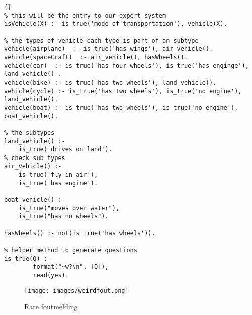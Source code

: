 \begin{lstlisting}{}
% this will be the entry to our expert system
isVehicle(X) :- is_true('mode of transportation'), vehicle(X).

% the types of vehicle each type is part of an subtype
vehicle(airplane)  :- is_true('has wings'), air_vehicle().
vehicle(spaceCraft)  :- air_vehicle(), hasWheels().
vehicle(car)  :- is_true('has four wheels'), is_true('has enginge'), land_vehicle() .
vehicle(bike) :- is_true('has two wheels'), land_vehicle().
vehicle(cycle) :- is_true('has two wheels'), is_true('no engine'), land_vehicle().
vehicle(boat) :- is_true('has two wheels'), is_true('no engine'), boat_vehicle().

% the subtypes
land_vehicle() :-
	is_true('drives on land').
% check sub types
air_vehicle() :-
	is_true('fly in air'),
	is_true('has engine').

boat_vehicle() :-
	is_true("moves over water"),
    is_true("has no wheels").

hasWheels() :- not(is_true('has wheels')).

% helper method to generate questions
is_true(Q) :-
        format("~w?\n", [Q]),
        read(yes).
\end{lstlisting}

\begin{figure}[!h]
    \centering
    \texttt{[image: images/weirdfout.png]}
    \caption{Rare foutmelding}
    \label{fig:rareFout}
\end{figure}{}
